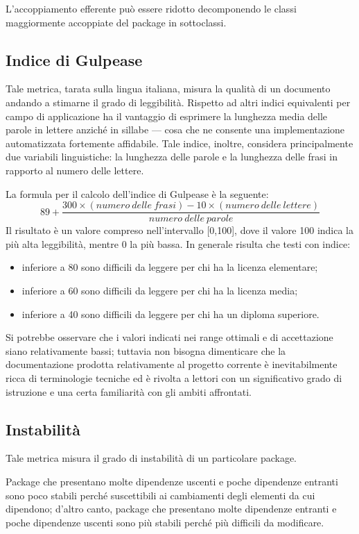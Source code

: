 L'accoppiamento efferente può essere ridotto decomponendo le classi maggiormente accoppiate del package in sottoclassi.

\subsection{Indice di Gulpease}
Tale metrica, tarata sulla lingua italiana, misura la qualità di un documento andando a stimarne il grado di leggibilità. Rispetto ad altri indici equivalenti per campo di applicazione ha il vantaggio di esprimere la lunghezza media delle parole in lettere anziché in sillabe --- cosa che ne consente una implementazione automatizzata fortemente affidabile. Tale indice, inoltre, considera principalmente due variabili linguistiche: la lunghezza delle parole e la lunghezza delle frasi in rapporto al numero delle lettere.

La formula per il calcolo dell'indice di Gulpease è la seguente:
\begin{equation}
	89+\frac{300\times(numero~delle~frasi)-10\times(numero~delle~lettere)}{numero~delle~parole}
\end{equation}
Il risultato è un valore compreso nell'intervallo [0,100], dove il valore 100 indica la più alta leggibilità, mentre 0 la più bassa. In generale risulta che testi con indice:
\begin{itemize}
	\item inferiore a 80 sono difficili da leggere per chi ha la licenza elementare;
	\item inferiore a 60 sono difficili da leggere per chi ha la licenza media;
	\item inferiore a 40 sono difficili da leggere per chi ha un diploma superiore.	
\end{itemize}
Si potrebbe osservare che i valori indicati nei range ottimali e di accettazione siano relativamente bassi; tuttavia non bisogna dimenticare che la documentazione prodotta relativamente al progetto corrente è inevitabilmente ricca di terminologie tecniche ed è rivolta a lettori con un significativo grado di istruzione e una certa familiarità con gli ambiti affrontati.

\subsection{Instabilità}
Tale metrica misura il grado di instabilità di un particolare package.

Package che presentano molte dipendenze uscenti e poche dipendenze entranti sono poco stabili perché suscettibili ai cambiamenti degli elementi da cui dipendono; d'altro canto, package che presentano molte dipendenze entranti e poche dipendenze uscenti sono più stabili perché più difficili da modificare.

